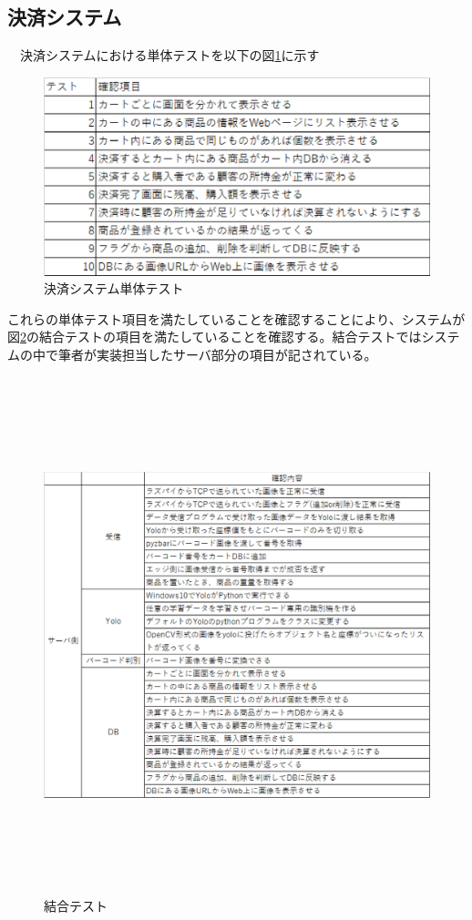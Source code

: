 \subsection*{決済システム}
　決済システムにおける単体テストを以下の図\ref{db_test}に示す
\begin{figure}[htbp]
\centering
\includegraphics[width=12cm]{./pic/db_test.eps}
\caption{決済システム単体テスト}
\label{db_test}
\end{figure}

\newpage

これらの単体テスト項目を満たしていることを確認することにより、システムが図\ref{join_test}の結合テストの項目を満たしていることを確認する。結合テストではシステムの中で筆者が実装担当したサーバ部分の項目が記されている。

\begin{figure}[htbp]
\centering
\includegraphics[height=15cm,width=15cm]{./pic/join_test.eps}
\caption{結合テスト}
\label{join_test}
\end{figure}

